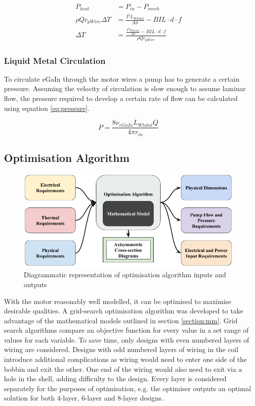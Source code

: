 \documentclass[a4paper,12pt]{article}
\begin{document}
\begin{equation}\label{eq:pheatbreakdown}
    \begin{split}
        P_{heat} & = P_{in}-P_{mech}\\
        \rho Q c_{pWire} \Delta T & = \frac{I^2L_{Wtotal}}{A\sigma}-BIL\cdot d \cdot f \\
        \Delta T & = \frac{\frac{I^2L_{Wtotal}}{A\sigma}-BIL\cdot d \cdot f}{\rho Q c_{pWire}}
    \end{split}
\end{equation}

\subsubsection{Liquid Metal Circulation}
To circulate eGaIn through the motor wires a pump has to generate a certain pressure. Assuming the velocity of circulation is slow enough to assume laminar flow, the pressure required to develop a certain rate of flow can be calculated using equation \ref{eq:pressure}.

\begin{equation}\label{eq:pressure}
    P=\frac{8\nu_{eGaIn}L_{Wtotal}Q}{4\pi r_{in}}
\end{equation}

\subsection{Optimisation Algorithm}

\begin{figure}[h!]
    \centering
    \includegraphics[scale=0.4]{optiAlgro.png}
    \caption{Diagrammatic representation of optimisation algorithm inputs and outputs}
    \label{fg:optiAlgo}
\end{figure}

With the motor reasonably well modelled, it can be optimised to maximise desirable qualities. A grid-search optimisation algorithm was developed to take advantage of the mathematical models outlined in section \ref{section:mm}. Grid search algorithms compare an objective function for every value in a set range of values for each variable. To save time, only designs with even numbered layers of wiring are considered. Designs with odd numbered layers of wiring in the coil introduce additional complications as wiring would need to enter one side of the bobbin and exit the other. One end of the wiring would also need to exit via a hole in the shell, adding difficulty to the design. Every layer is considered separately for the purposes of optimisation, e.g. the optimiser outputs an optimal solution for both 4-layer, 6-layer and 8-layer designs.
\end{document}
